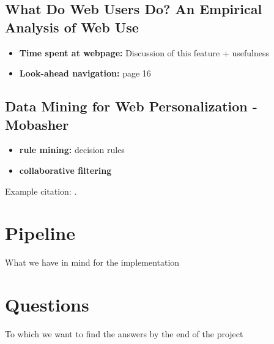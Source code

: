 \documentclass[a4paper,11pt]{article}
\begin{document}
\subsection{What Do Web Users Do? An Empirical Analysis of Web Use}
\begin{itemize}
	\item \textbf{Time spent at webpage:} Discussion of this feature + usefulness
	\item \textbf{Look-ahead navigation:} page 16
\end{itemize}

\subsection{Data Mining for Web Personalization - Mobasher}
\begin{itemize}
	\item \textbf{rule mining:} decision rules
	\item \textbf{collaborative filtering}
\end{itemize}


Example citation: \cite{microsoft-smartfavorites}.

\section{Pipeline}
What we have in mind for the implementation

\section{Questions}
To which we want to find the answers by the end of the project



\end{document}
